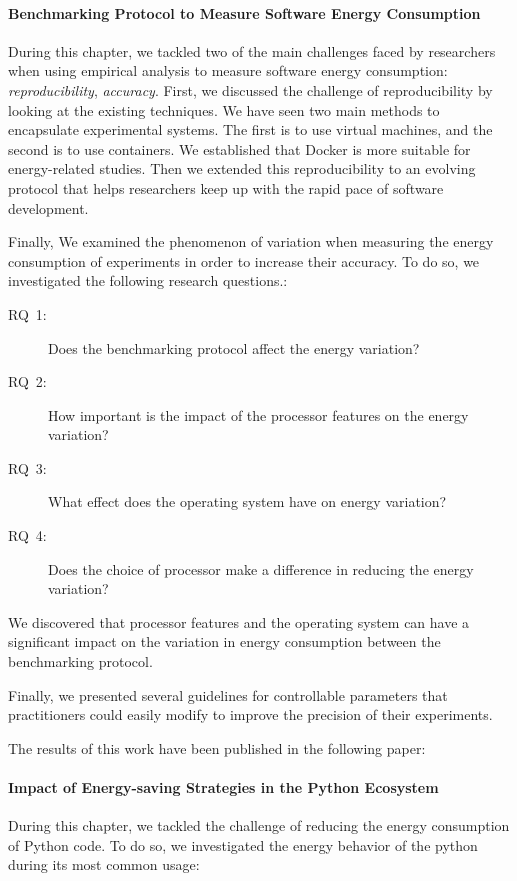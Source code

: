 \paragraph*{Benchmarking Protocol to Measure Software Energy Consumption}
During this chapter, we tackled two of the main challenges faced by researchers when using empirical analysis to measure software energy consumption: \emph{reproducibility}, \emph{accuracy}.
First, we discussed the challenge of reproducibility by looking at the existing techniques. We have seen two main methods to encapsulate experimental systems. The first is to use virtual machines, and the second is to use containers. We established that Docker is more suitable for energy-related studies. Then we extended this reproducibility to an evolving protocol that helps researchers keep up with the rapid pace of software development.

Finally, We examined the phenomenon of variation when measuring the energy consumption of experiments in order to increase their accuracy. To do so, we investigated the following research questions.:
\begin{description}
      \item[\textsc{RQ}~1:] Does the benchmarking protocol affect the energy variation?
      \item[\textsc{RQ}~2:] How important is the impact of the processor features on the energy variation?
      \item[\textsc{RQ}~3:] What effect does the operating system have on energy variation?
      \item[\textsc{RQ}~4:] Does the choice of processor make a difference in reducing the energy variation?
\end{description}

We discovered that processor features and the operating system can have a significant impact on the variation in energy consumption between the benchmarking protocol.

Finally, we presented several guidelines for controllable parameters that practitioners could easily modify to improve the precision of their experiments.

The results of this work have been published in the following paper:
\\

\paragraph*{Impact of Energy-saving Strategies in the Python Ecosystem}
During this chapter, we tackled the challenge of reducing the energy consumption of Python code.
To do so, we investigated the energy behavior of the python during its most common usage:

